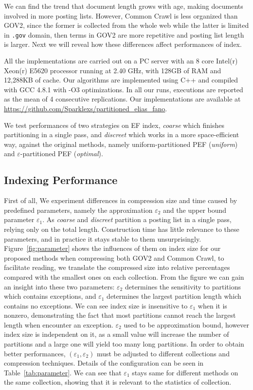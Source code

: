 \documentclass[runningheads,a4paper]{llncs}
\begin{document}
We can find the trend that document length grows with age, making documents involved in more posting lists.
However, Common Crawl is less organized than GOV2, since the former is collected from the whole web while the latter is limited in \texttt{.gov} domain, then terms in GOV2 are more repetitive and posting list length is larger.
Next we will reveal how these differences affect performances of index.

All the implementations are carried out on a PC server with an 8 core Intel(r) Xeon(r) E5620 processor running at 2.40 GHz, with 128GB of RAM and 12,288KB of cache.
Our algorithms are implemented using C++ and compiled with GCC 4.8.1 with -O3 optimizations.
In all our runs, executions are reported as the mean of 4 consecutive replications.
Our implementations are available at \url{https://github.com/Sparklexs/partitioned_elias_fano}.

We test performances of two strategies on EF index, \textit{coarse} which finishes partitioning in a single pass, and \textit{discreet} which works in a more space-efficient way, against the original methods, namely uniform-partitioned PEF (\textit{uniform}) and $\varepsilon$-partitioned PEF (\textit{optimal}).

\subsection{Indexing Performance}

First of all, We experiment differences in compression size and time caused by predefined parameters, namely the approximation $\varepsilon_{2}$ and the upper bound parameter $\varepsilon_{1}$.
As \textit{coarse} and \textit{discreet} partition a posting list in a single pass, relying only on the total length.
Construction time has little relevance to these parameters, and in practice it stays stable to them unsurprisingly.
Figure~\ref{fig:parameter} shows the influences of them on index size for our proposed methods when compressing both GOV2 and Common Crawl, to facilitate reading, we translate the compressed size into relative percentages compared with the smallest ones on each collection.
From the figure we can gain an insight into these two parameters: $\varepsilon_{2}$ determines the sensitivity to partitions which contains exceptions, and $\varepsilon_{1}$ determines the largest partition length which contains no exceptions.
We can see index size is insensitive to $\varepsilon_{1}$ when it is nonzero, demonstrating the fact that most partitions cannot reach the largest length when encounter an exception.
$\varepsilon_{2}$ used to be approximation bound, however index size is independent on it, as a small value will increase the number of partitions and a large one will yield too many long partitions.
In order to obtain better performances, $ \left( \varepsilon_1,\varepsilon_2 \right) $ must be adjusted to different collections and compression techniques.
Details of the configuration can be seen in Table~\ref{tab:parameter}.
We can see that $ \varepsilon_1 $ stays same for different methods on the same collection, showing that it is relevant to the statistics of collection.
\end{document}
